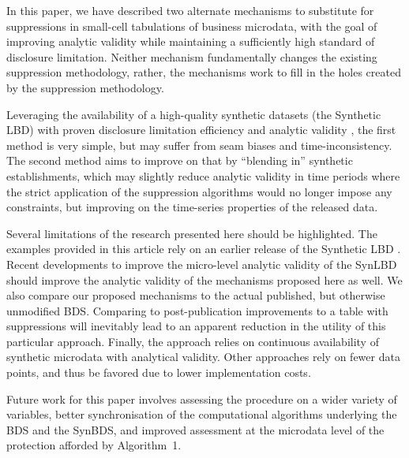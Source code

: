 In this paper, we have described two alternate mechanisms to substitute for suppressions in  small-cell tabulations of business 
microdata, with the goal of improving analytic validity while maintaining a sufficiently high 
standard of disclosure limitation. Neither mechanism fundamentally changes the existing suppression methodology, rather, the mechanisms work to fill in the holes created by the suppression methodology. 

Leveraging the availability of a high-quality synthetic datasets 
(the Synthetic LBD) with proven disclosure limitation efficiency and analytic validity \cite{KinneyEtAl2011}, the first 
method is very simple, but may suffer from seam biases and time-inconsistency. The second 
method aims to improve on that by ``blending in'' synthetic establishments, which may slightly 
reduce analytic validity in time periods where the strict application of the suppression 
algorithms would no longer impose any constraints, but improving on the time-series properties 
of the released data. 

Several limitations of the research presented here should be highlighted. The examples provided in this article rely on an earlier release of the Synthetic LBD 
\cite{KinneyEtAl2011}. Recent developments to improve the micro-level analytic validity of the 
\ac{SynLBD} \cite{CES-WP-2014-12} should improve the analytic validity of the mechanisms 
proposed here as well.  We also compare our proposed mechanisms to the actual published, but otherwise unmodified \ac{BDS}. Comparing to post-publication improvements to a table with suppressions \cite{HolanEtAl2010} will inevitably lead to an apparent reduction in the utility of this particular approach. Finally, the approach relies on continuous availability of synthetic microdata with analytical validity. Other approaches rely on fewer data points, and thus be favored due to lower implementation costs.

Future work for this paper involves assessing the procedure on a wider variety of variables, better synchronisation of the computational algorithms underlying the BDS and the SynBDS, and improved assessment at the microdata level of the protection afforded by Algorithm~1.





